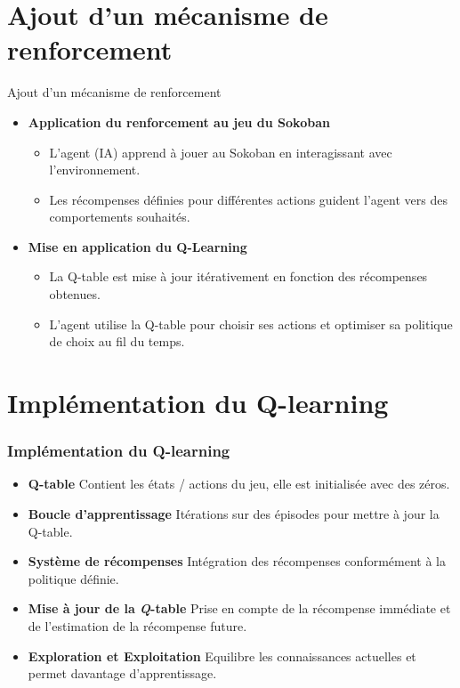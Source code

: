 \documentclass[
	11pt, %
]{beamer}
\begin{document}
\section{Ajout d'un mécanisme de renforcement}

\begin{frame}{Ajout d'un mécanisme de renforcement}
    \begin{itemize}
        \item \textbf{Application du renforcement au jeu du Sokoban}
            \begin{itemize}
                \item L'agent (IA) apprend à jouer au Sokoban en interagissant avec l'environnement.
                \item Les récompenses définies pour différentes actions guident l'agent vers des comportements souhaités.
            \end{itemize}
        \item \textbf{Mise en application du Q-Learning}
            \begin{itemize}
                \item La Q-table est mise à jour itérativement en fonction des récompenses obtenues.
                \item L'agent utilise la Q-table pour choisir ses actions et optimiser sa politique de choix au fil du temps.
            \end{itemize}
    \end{itemize}
\end{frame}
\section{Implémentation du Q-learning}

\begin{frame}
	\frametitle{Implémentation du Q-learning}

	\begin{itemize}
        \item \textbf{Q-table} Contient les états / actions du jeu, elle est initialisée avec des zéros.
        \item \textbf{Boucle d'apprentissage} Itérations sur des épisodes pour mettre à jour la Q-table.
        \item \textbf{Système de récompenses} Intégration des récompenses conformément à la politique définie.
        \item \textbf{Mise à jour de la \textbf \textit Q-table} Prise en compte de la récompense immédiate et de l'estimation de la récompense future.
        \item \textbf{Exploration et Exploitation} Equilibre les connaissances actuelles et permet davantage d'apprentissage.
    \end{itemize}

\end{frame}
\end{document}
